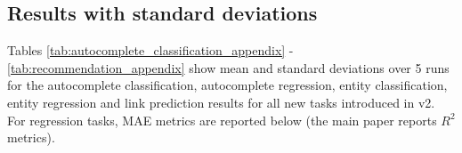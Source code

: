 
\subsection{Results with standard deviations}

Tables \ref{tab:autocomplete_classification_appendix} - \ref{tab:recommendation_appendix} show mean and standard deviations over 5 runs for the autocomplete classification, autocomplete regression, entity classification, entity regression and link prediction results for all new tasks introduced in \relbench v2. For regression tasks, MAE metrics are reported below (the main paper reports $R^2$ metrics).

\begin{table}[!ht]
  \centering
  \caption{{\bf Autocomplete binary classification results on \relbench.} Binary classification uses the AUROC metric (higher is better). Standard baselines of random choice and majority class both correspond to AUROC values of approximately 50.00, so we exclude them below. Best values are in bold.}
  \label{tab:autocomplete_classification_appendix}
  \renewcommand{\arraystretch}{1.1}
  \scriptsize
  \resizebox{\textwidth}{!}{
    
  }
  \vspace{-10pt}
\end{table}


\begin{table}[!ht]
  \centering
  \caption{{\bf Autocomplete multiclass classification results on \relbench.} Multiclass classification uses the accuracy metric (higher is better). Best values are in bold.}
  \label{tab:autocomplete_multiclass_appendix}
  \renewcommand{\arraystretch}{1.1}
  \scriptsize
    
  \vspace{-10pt}
\end{table}

\begin{table}[!ht]
  \centering
  \caption{{\bf Autocomplete regression $R^2$ results on \relbench.} Regression uses the $R^2$ metric (higher is better). Best values are in bold.}
  \label{tab:autocomplete_regression_r2_appendix}
  \renewcommand{\arraystretch}{1.1}
  \scriptsize
    \resizebox{\textwidth}{!}{
    
    }
  \vspace{10pt}
\end{table}

